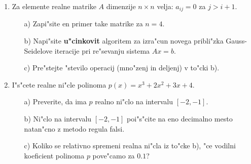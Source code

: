\begin{enumerate}
        \item Za elemente realne matrike $A$ dimenzije $n\times n$ 
          velja: $a_{ij}=0$ za $j>i+1$.
          \begin{itemize}
            \item[a)] Zapi"site en primer take matrike za $n=4$.
            \item[b)] Napi"site {\bf u"cinkovit} algoritem za 
              izra"cun novega pribli"zka Gauss-Seidelove iteracije pri re"sevanju 
	      sistema $A x = b$.
            \item[c)] Pre"stejte "stevilo operacij (mno"zenj in deljenj)
              v to"cki b).
          \end{itemize} 
        \item I"s"cete realne ni"cle polinoma $p(x)=x^3+2x^2+3x+4$.
        \begin{itemize}
                \item[a)] Preverite, da ima $p$ realno ni"clo na
                  intervalu $[-2,-1]$.
                \item[b)] Ni"clo na intervalu $[-2,-1]$ poi"s"cite na
                  eno decimalno mesto na\-tan\-"cno z metodo regula falsi.
                \item[c)] Koliko se relativno spremeni realna ni"cla
                  iz to"cke b), "ce vodilni koeficient polinoma $p$
                  pove"camo za $0.1$?
        \end{itemize} 
\end{enumerate}
